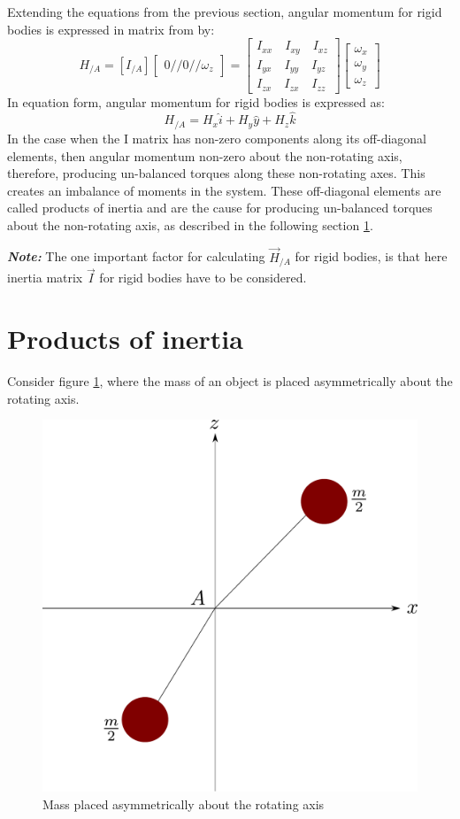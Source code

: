 Extending the equations from the previous section, angular momentum for rigid bodies is expressed in matrix from by:
\begin{equation}
	H_{/A} = \left[I_{/A}\right]\begin{bmatrix}
		0 // 0 // \omega_{z}
	\end{bmatrix} = \begin{bmatrix}
		I_{xx} \quad I_{xy} \quad I_{xz} \\
		I_{yx} \quad I_{yy} \quad I_{yz} \\
		I_{zx} \quad I_{zx} \quad I_{zz}
	\end{bmatrix} \begin{bmatrix}
	\omega_{x} \\ \omega_{y} \\ \omega_{z}
	\end{bmatrix}
\end{equation}
In equation form, angular momentum for rigid bodies is expressed as:
\begin{equation}
	H_{/A} = H_{x} \hat{i} + H_{y} \hat{y} + H_{z} \hat{k}
\end{equation}
In the case when the I matrix has non-zero components along its off-diagonal elements, then angular momentum non-zero about the non-rotating axis, therefore, producing un-balanced torques along these non-rotating axes. This creates an imbalance of moments in the system. These off-diagonal elements are called products of inertia and are the cause for producing un-balanced torques about the non-rotating axis, as described in the following section \ref{Sec_ProdOfInertia}.

\textbf{\textit{Note: }} The one important factor for calculating $\vec{H}_{/A}$ for rigid bodies, is that here inertia matrix $\vec{I}$ for rigid bodies have to be considered.

\section{Products of inertia} \label{Sec_ProdOfInertia}

Consider figure \ref{fig_0_ch_5_prodOfInertia_1}, where the mass of an object is placed asymmetrically about the rotating axis.
\begin{figure}[h!]
	\centering
	\includegraphics[width=0.5\linewidth]{Bilder/27_ProdOfInertia.pdf}
	\caption{Mass placed asymmetrically about the rotating axis}
	\label{fig_0_ch_5_prodOfInertia_1}
\end{figure}

